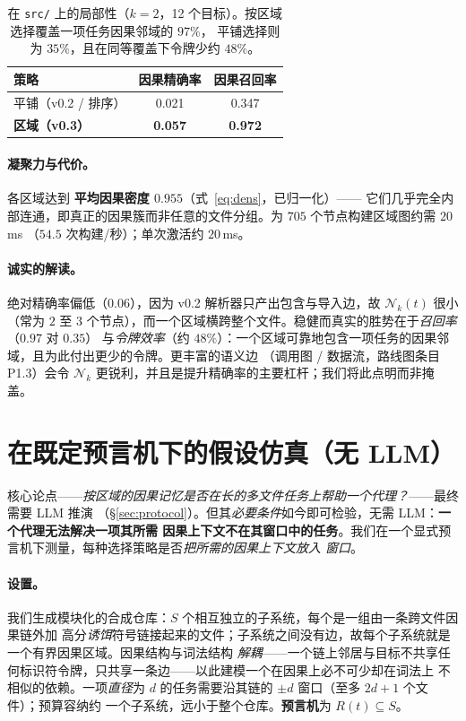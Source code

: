 \documentclass[11pt]{ctexart}
\newcommand{\Nk}{\mathcal{N}_k}
\newcommand{\code}[1]{\texttt{#1}}
\begin{document}
\begin{table}[h]
\centering
\begin{tabular}{lcc}
\toprule
策略 & 因果精确率 & 因果召回率 \\
\midrule
平铺（v0.2 / 排序） & 0.021 & 0.347 \\
\textbf{区域（v0.3）} & \textbf{0.057} & \textbf{0.972} \\
\bottomrule
\end{tabular}
\caption{在 \code{src/} 上的局部性（$k=2$，12 个目标）。按区域选择覆盖一项任务因果邻域的 $97\%$，
平铺选择则为 $35\%$，且在同等覆盖下令牌少约 $48\%$。}
\label{tab:locality}
\end{table}

\paragraph{凝聚力与代价。} 各区域达到 \textbf{平均因果密度 $0.955$}（式~\ref{eq:dens}，已归一化）——
它们几乎完全内部连通，即真正的因果簇而非任意的文件分组。为 $705$ 个节点构建区域图约需 $20$\,ms
（$54.5$ 次构建/秒）；单次激活约 $20$\,ms。

\paragraph{诚实的解读。} 绝对精确率偏低（$0.06$），因为 v0.2 解析器只产出包含与导入边，故 $\Nk(t)$ 很小
（常为 $2$ 至 $3$ 个节点），而一个区域横跨整个文件。稳健而真实的胜势在于\emph{召回率}（$0.97$ 对 $0.35$）
与\emph{令牌效率}（约 $48\%$）：一个区域可靠地包含一项任务的因果邻域，且为此付出更少的令牌。更丰富的语义边
（调用图 / 数据流，路线图条目 P1.3）会令 $\Nk$ 更锐利，并且是提升精确率的主要杠杆；我们将此点明而非掩盖。

\section{在既定预言机下的假设仿真（无 LLM）}\label{sec:sim}

核心论点——\emph{按区域的因果记忆是否在长的多文件任务上帮助一个代理？}——最终需要 LLM 推演
（\S\ref{sec:protocol}）。但其\emph{必要条件}如今即可检验，无需 LLM：\textbf{一个代理无法解决一项其所需
因果上下文不在其窗口中的任务}。我们在一个显式预言机下测量，每种选择策略是否\emph{把所需的因果上下文放入
窗口}。

\paragraph{设置。} 我们生成模块化的合成仓库：$S$ 个相互独立的子系统，每个是一组由一条跨文件因果链外加
高分\emph{诱饵}符号链接起来的文件；子系统之间没有边，故每个子系统就是一个有界因果区域。因果结构与词法结构
\emph{解耦}——一个链上邻居与目标不共享任何标识符令牌，只共享一条边——以此建模一个在因果上必不可少却在词法上
不相似的依赖。一项\emph{直径}为 $d$ 的任务需要沿其链的 $\pm d$ 窗口（至多 $2d{+}1$ 个文件）；预算容纳约
一个子系统，远小于整个仓库。\textbf{预言机}为 $R(t)\subseteq S$。
\end{document}
